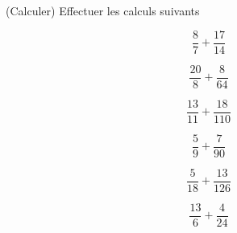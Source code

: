  (Calculer) Effectuer les calculs suivants

\begin{multicols}{6}
$$\dfrac{8}{7}+\dfrac{17}{14}$$

$$\dfrac{20}{8}+\dfrac{8}{64}$$

$$\dfrac{13}{11}+\dfrac{18}{110}$$

$$\dfrac{5}{9}+\dfrac{7}{90}$$

$$\dfrac{5}{18}+\dfrac{13}{126}$$

$$\dfrac{13}{6}+\dfrac{4}{24}$$

\end{multicols}